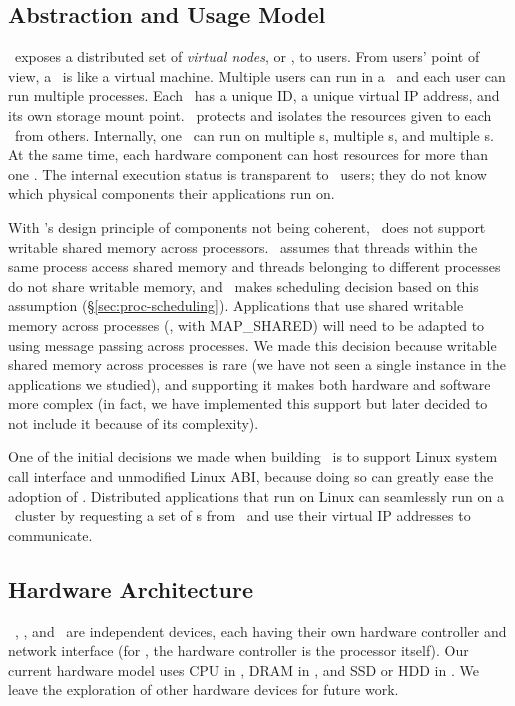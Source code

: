 \documentclass[10pt,times,twocolumn]{z2-article}
\begin{document}
{{{{{{{\begin{itemize}
\end{itemize}

\subsection{Abstraction and Usage Model}
\lego\ exposes a distributed set of {\em virtual nodes}, or {\em \vnode}, to users.
From users' point of view, a \vnode\ is like a virtual machine. 
Multiple users can run in a \vnode\ and each user can run multiple processes.
Each \vnode\ has a unique ID, a unique virtual IP address, %
and its own storage mount point. %
\lego\ protects and isolates the resources given to each \vnode\ from others.
Internally, one \vnode\ can run on multiple \pcomponent{}s, multiple \mcomponent{}s,
and multiple \scomponent{}s.
At the same time, each hardware component can host resources for more than one \vnode.
The internal execution status is transparent to \lego\ users;
they do not know which physical components their applications run on.

With \splitkernel's design principle of components not being coherent,
\lego\ does not support writable shared memory across processors. %
\lego\ assumes that threads within the same process access shared memory
and threads belonging to different processes do not share writable memory,
and \lego\ makes scheduling decision based on this assumption (\S\ref{sec:proc-scheduling}).
Applications that use shared writable memory across processes (\eg, with MAP\_SHARED)
will need to be adapted to using message passing across processes.
We made this decision because writable shared memory across processes is rare 
(we have not seen a single instance in the applications we studied),
and supporting it makes both hardware and software more complex 
(in fact, we have implemented this support but later decided to not include it because of its complexity).

One of the initial decisions we made when building \lego\ is to support Linux system call interface 
and unmodified Linux ABI,
because doing so can greatly ease the adoption of \lego.
Distributed applications that run on Linux can seamlessly run on a \lego\ cluster
by requesting a set of \vnode{}s from \lego\ and use their virtual IP addresses to communicate.

\subsection{Hardware Architecture}
\label{sec:hardware}
\lego\ \pcomponent, \mcomponent, and \scomponent\ are independent devices,
each having their own hardware controller and network interface (for \pcomponent, the hardware controller is the processor itself).
Our current hardware model uses CPU in \pcomponent, 
DRAM in \mcomponent, and SSD or HDD in \scomponent.
We leave the exploration of other hardware devices for future work.

}}}}}}}
\end{document}
